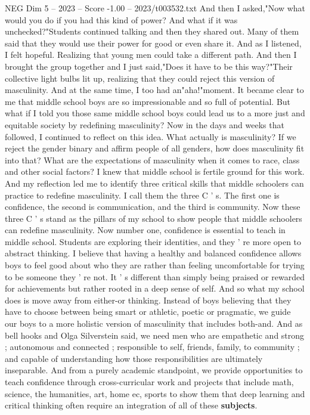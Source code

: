 \begin{textsample}{NEG Dim 5 – 2023 – Score -1.00 – 2023/t003532.txt}
And then I asked,"Now what would you do if you had this kind of power?
And what if it was unchecked?"Students continued talking and then they shared out.
Many of them said that they would use their power for good or even share it.
And as I listened, I felt hopeful.
Realizing that young men could take a different path.
And then I brought the group together and I just said,"Does it have to be this way?"Their collective light bulbs lit up, realizing that they could reject this version of masculinity.
And at the same time, I too had an"aha!"moment.
It became clear to me that middle school boys are so impressionable and so full of potential.
But what if I told you those same middle school boys could lead us to a more just and equitable society by redefining masculinity?
Now in the days and weeks that followed, I continued to reflect on this idea.
What actually is masculinity?
If we reject the gender binary and affirm people of all genders, how does masculinity fit into that?
What are the expectations of masculinity when it comes to race, class and other social factors?
I knew that middle school is fertile ground for this work.
And my reflection led me to identify three critical skills that middle schoolers can practice to redefine masculinity.
I call them the three C ' s.
The first one is confidence, the second is communication, and the third is community.
Now these three C ' s stand as the pillars of my school to show people that middle schoolers can redefine masculinity.
Now number one, confidence is essential to teach in middle school.
Students are exploring their identities, and they ' re more open to abstract thinking.
I believe that having a healthy and balanced confidence allows boys to feel good about who they are rather than feeling uncomfortable for trying to be someone they ' re not.
It ' s different than simply being praised or rewarded for achievements but rather rooted in a deep sense of self.
And so what my school does is move away from either-or thinking.
Instead of boys believing that they have to choose between being smart or athletic, poetic or pragmatic, we guide our boys to a more holistic version of masculinity that includes both-and.
And as bell hooks and Olga Silverstein said, we need men who are empathetic and strong ; autonomous and connected ; responsible to self, friends, family, to community ; and capable of understanding how those responsibilities are ultimately inseparable.
And from a purely academic standpoint, we provide opportunities to teach confidence through cross-curricular work and projects that include math, science, the humanities, art, home ec, sports to show them that deep learning and critical thinking often require an integration of all of these \textbf{subjects}.

\end{textsample}
